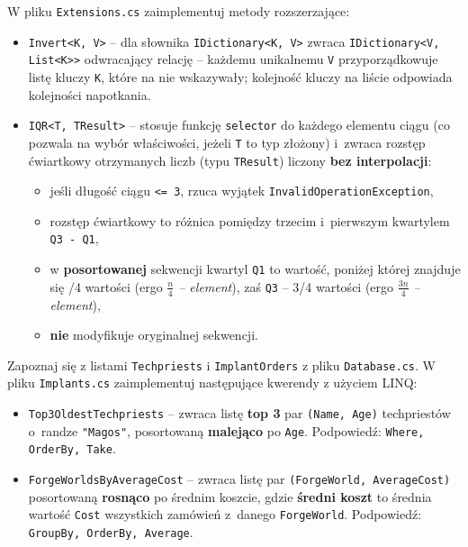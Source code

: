 \documentclass[11pt,a4paper,addpoints]{exam}
\renewcommand*\half{.5}
\begin{document}
\begin{questions}
\question[2] W pliku \texttt{Extensions.cs} zaimplementuj metody rozszerzające:
\begin{itemize}
    \item \texttt{Invert<K, V>} -- dla słownika \texttt{IDictionary<K, V>} zwraca \texttt{IDictionary<V, List<K>>} odwracający relację -- każdemu unikalnemu \texttt{V} przyporządkowuje listę kluczy \texttt{K}, które na nie wskazywały; kolejność kluczy na liście odpowiada kolejności napotkania.
    \item \texttt{IQR<T, TResult>} -- stosuje funkcję \texttt{selector} do każdego elementu ciągu (co pozwala na wybór właściwości, jeżeli \texttt{T} to typ złożony) i~zwraca rozstęp ćwiartkowy otrzymanych liczb (typu \texttt{TResult}) liczony \textbf{bez interpolacji}:
    \begin{itemize}
        \item jeśli długość ciągu \texttt{<= 3}, rzuca wyjątek \texttt{InvalidOperationException},
        \item rozstęp ćwiartkowy to różnica pomiędzy trzecim i~pierwszym kwartylem \texttt{Q3 - Q1},
        \item w \textbf{posortowanej} sekwencji kwartyl \texttt{Q1} to wartość, poniżej której znajduje się /4 wartości (ergo \textit{$\frac{n}{4}$ -- element}), zaś \texttt{Q3} -- 3/4 wartości (ergo \textit{$\frac{3n}{4}$ -- element}),
        \item \textbf{nie} modyfikuje oryginalnej sekwencji.
    \end{itemize}
\end{itemize}

\question[1\half] Zapoznaj się z listami \texttt{Techpriests} i \texttt{ImplantOrders} z pliku \texttt{Database.cs}. W pliku \texttt{Implants.cs} zaimplementuj następujące kwerendy z użyciem LINQ:
\begin{itemize}
    \item \texttt{Top3OldestTechpriests} -- zwraca listę \textbf{top 3} par \texttt{(Name, Age)} techpriestów o~randze \texttt{"Magos"}, posortowaną \textbf{malejąco} po \texttt{Age}.\newline
    Podpowiedź: \texttt{Where, OrderBy, Take}.
    \item \texttt{ForgeWorldsByAverageCost} -- zwraca listę par \texttt{(ForgeWorld, AverageCost)} posortowaną \textbf{rosnąco} po średnim koszcie, gdzie \textbf{średni koszt} to średnia wartość \texttt{Cost} \break wszystkich zamówień z~danego \texttt{ForgeWorld}.\newline
    Podpowiedź: \texttt{GroupBy, OrderBy, Average}.
\end{itemize}

\end{questions}
\end{document}
